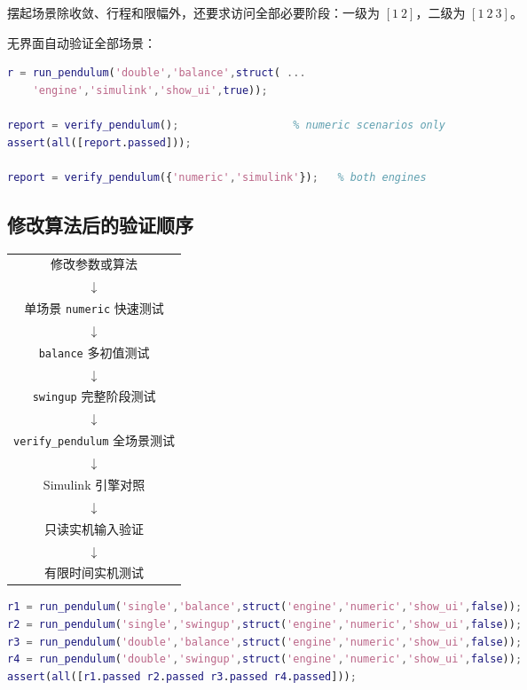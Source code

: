 \documentclass[12pt,a4paper]{article}
\begin{document}
摆起场景除收敛、行程和限幅外，还要求访问全部必要阶段：一级为 $[1\ 2]$，二级为 $[1\ 2\ 3]$。

无界面自动验证全部场景：

\begin{lstlisting}[language=Matlab, caption={指定 Simulink 引擎与自动验证}, label={lst:verify}]
r = run_pendulum('double','balance',struct( ...
    'engine','simulink','show_ui',true));

report = verify_pendulum();                  % numeric scenarios only
assert(all([report.passed]));

report = verify_pendulum({'numeric','simulink'});   % both engines
\end{lstlisting}

\subsection{修改算法后的验证顺序}

\begin{center}
    \renewcommand{\arraystretch}{1.3}
    \begin{tabular}{@{}c@{}}
        修改参数或算法 \\
        $\downarrow$ \\
        单场景 \texttt{numeric} 快速测试 \\
        $\downarrow$ \\
        \texttt{balance} 多初值测试 \\
        $\downarrow$ \\
        \texttt{swingup} 完整阶段测试 \\
        $\downarrow$ \\
        \texttt{verify\_pendulum} 全场景测试 \\
        $\downarrow$ \\
        Simulink 引擎对照 \\
        $\downarrow$ \\
        只读实机输入验证 \\
        $\downarrow$ \\
        有限时间实机测试 \\
    \end{tabular}
\end{center}

\begin{lstlisting}[language=Matlab, caption={修改算法后的推荐离线验证命令}, label={lst:verifyseq}]
r1 = run_pendulum('single','balance',struct('engine','numeric','show_ui',false));
r2 = run_pendulum('single','swingup',struct('engine','numeric','show_ui',false));
r3 = run_pendulum('double','balance',struct('engine','numeric','show_ui',false));
r4 = run_pendulum('double','swingup',struct('engine','numeric','show_ui',false));
assert(all([r1.passed r2.passed r3.passed r4.passed]));
\end{lstlisting}
\end{document}
